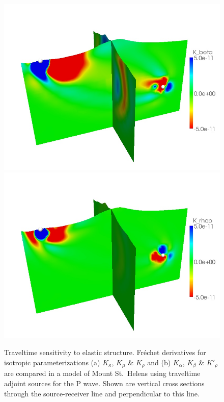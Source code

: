 \documentclass[referee,extra]{gji}
\begin{document}
\begin{figure}
\begin{center}
\begin{minipage}[t]{0.49\textwidth}
\begin{center}
\includegraphics[width=1.\textwidth]{./images/mount_beta_kernel.jpg} \\
\includegraphics[width=1.\textwidth]{./images/mount_rhop_kernel.jpg}
\end{center}
\end{minipage}
\end{center}
\caption{Traveltime sensitivity to elastic structure.
Fr\'echet derivatives for isotropic parameterizations (a) $K_\kappa$, $K_\mu$ \& $K_\rho$ and (b) $K_\alpha$, $K_\beta$ \& $K'_{\rho}$ are compared in a model of Mount St.~Helens using traveltime adjoint sources for the P wave.
Shown are vertical cross sections through the source-receiver line and perpendicular to this line.
}
\label{figure:kerneliso}
\end{figure}
\end{document}

